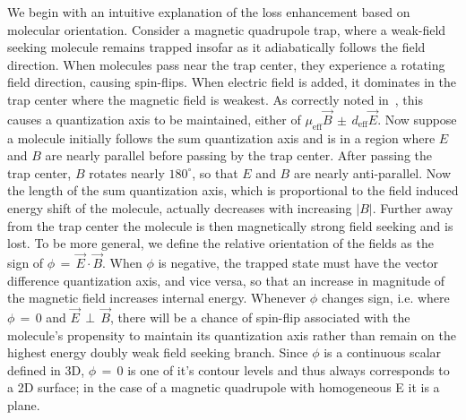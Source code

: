 \documentclass[%
 reprint,
 amsmath,amssymb,
 aps,
prl,
]{revtex4-1}
\newcommand{\epb}{{$\vec{E}\,{\perp}\,\vec{B}$}}
\begin{document}

We begin with an intuitive explanation of the loss enhancement based on molecular orientation.
Consider a magnetic quadrupole trap, where a weak-field seeking molecule remains trapped insofar as it adiabatically follows the field direction. 
When molecules pass near the trap center, they experience a rotating field direction, causing spin-flips. 
When electric field is added, it dominates in the trap center where the magnetic field is weakest. 
As correctly noted in~\cite{Bohn2013}, this causes a quantization axis to be maintained, either of $\mu_\text{eff}\vec{B}\,{\pm}\, d_\text{eff}\vec{E}$.
Now suppose a molecule initially follows the sum quantization axis and is in a region where $E$ and $B$ are nearly parallel before passing by the trap center.
After passing the trap center, $B$ rotates nearly $180^\circ$, so that $E$ and $B$ are nearly anti-parallel. 
Now the length of the sum quantization axis, which is proportional to the field induced energy shift of the molecule, actually decreases with increasing $|B|$.
Further away from the trap center the molecule is then magnetically strong field seeking and is lost. 
To be more general, we define the relative orientation of the fields as the sign of $\phi\,{=}\,\vec{E}\cdot\vec{B}$. 
When $\phi$ is negative, the trapped state must have the vector difference quantization axis, and vice versa, so that an increase in magnitude of the magnetic field increases internal energy. 
Whenever $\phi$ changes sign, i.e. where $\phi\,{=}\,0$ and \epb, there will be a chance of spin-flip associated with the molecule's propensity to maintain its quantization axis rather than remain on the highest energy doubly weak field seeking branch.
Since $\phi$ is a continuous scalar defined in 3D, $\phi\,{=}\,0$ is one of it's contour levels and thus always corresponds to a 2D surface; in the case of a magnetic quadrupole with homogeneous E it is a plane.
\end{document}
